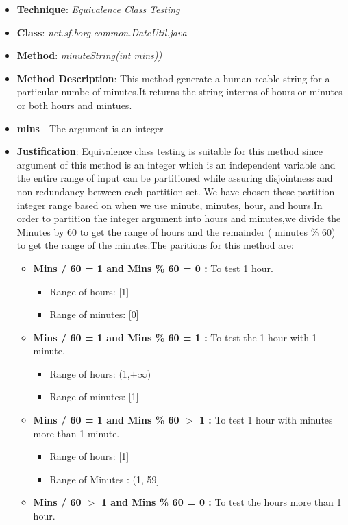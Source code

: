 \documentclass[fontsize=12pt,paper=letter,twoside]{scrartcl}
\begin{document}
\begin{itemize}
\item \textbf{Technique}: \emph{Equivalence Class Testing}
\item \textbf{Class}: \emph{net.sf.borg.common.DateUtil.java}
\item \textbf{Method}: \emph{minuteString(int mins))}
\item \textbf{Method Description}:
This method generate a human reable string for a particular numbe of minutes.It returns the string interms of hours or minutes or both hours and mintues.
\item \textbf{mins} - The argument is an integer
\item \textbf{Justification}: Equivalence class testing is suitable for this method since argument of this method is an integer which is an independent variable and the entire range of input can be partitioned while assuring disjointness and non-redundancy between each partition set. We have chosen these partition integer range based on when we use minute, minutes, hour, and hours.In order to partition the integer argument into hours and minutes,we divide the Minutes by 60 to get the range of hours and  the remainder ( minutes \% 60) to get the range of the minutes.The paritions for this method are:
 \begin{itemize}
\item \textbf{ Mins / 60 = 1 and Mins \% 60 = 0 :} To test 1 hour.
 \begin{itemize}
 \item Range of hours: [1]
 \item Range of minutes: [0]
\end{itemize}
\item \textbf{ Mins / 60 = 1 and Mins \% 60 = 1 :} To test the 1 hour with 1 minute.
 \begin{itemize}
 \item Range of hours: (1,$+\infty$)
 \item Range of minutes: [1]
\end{itemize}
\item \textbf{ Mins / 60 = 1 and Mins \% 60  $>$  1 :} To test 1 hour with minutes more than 1 minute. 
 \begin{itemize}
 \item  Range of hours: [1]
\item  Range of Minutes : (1, 59]
\newpage
\end{itemize}
\item \textbf{ Mins / 60 $>$ 1 and Mins \% 60 = 0 :} To test the hours more than 1 hour.

\end{itemize}
\end{itemize}
\end{document}
